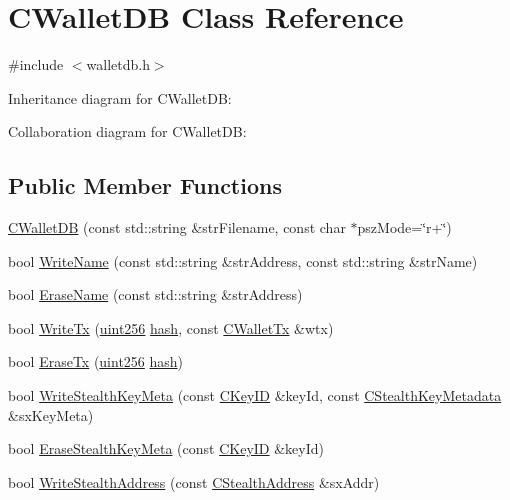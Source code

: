 \hypertarget{class_c_wallet_d_b}{}\section{C\+Wallet\+D\+B Class Reference}
\label{class_c_wallet_d_b}


{\ttfamily \#include $<$walletdb.\+h$>$}



Inheritance diagram for C\+Wallet\+D\+B\+:


Collaboration diagram for C\+Wallet\+D\+B\+:
\subsection*{Public Member Functions}
\begin{DoxyCompactItemize}
\item 
\hyperlink{class_c_wallet_d_b_abb8766ee5b03e8115438726c625f88a7}{C\+Wallet\+D\+B} (const std\+::string \&str\+Filename, const char $\ast$psz\+Mode=\char`\"{}r+\char`\"{})
\item 
bool \hyperlink{class_c_wallet_d_b_ad1b3bce77e9dd6ddd8c668a469c38f0a}{Write\+Name} (const std\+::string \&str\+Address, const std\+::string \&str\+Name)
\item 
bool \hyperlink{class_c_wallet_d_b_a319209fcf90ea860b668b92c44a3fa7a}{Erase\+Name} (const std\+::string \&str\+Address)
\item 
bool \hyperlink{class_c_wallet_d_b_a76d2ca02898221ab66df5d5f7491164e}{Write\+Tx} (\hyperlink{classuint256}{uint256} \hyperlink{cache_8cc_a11ecb029164e055f28f4123ce3748862}{hash}, const \hyperlink{class_c_wallet_tx}{C\+Wallet\+Tx} \&wtx)
\item 
bool \hyperlink{class_c_wallet_d_b_a498e00c693cacc4b558e6f5295ea32f2}{Erase\+Tx} (\hyperlink{classuint256}{uint256} \hyperlink{cache_8cc_a11ecb029164e055f28f4123ce3748862}{hash})
\item 
bool \hyperlink{class_c_wallet_d_b_a68428260802d8acd1a6f87f92b991841}{Write\+Stealth\+Key\+Meta} (const \hyperlink{class_c_key_i_d}{C\+Key\+I\+D} \&key\+Id, const \hyperlink{class_c_stealth_key_metadata}{C\+Stealth\+Key\+Metadata} \&sx\+Key\+Meta)
\item 
bool \hyperlink{class_c_wallet_d_b_a401ec8ec6c7e38cf87be9b92f95052a4}{Erase\+Stealth\+Key\+Meta} (const \hyperlink{class_c_key_i_d}{C\+Key\+I\+D} \&key\+Id)
\item 
bool \hyperlink{class_c_wallet_d_b_a2bce6f7f050d6d14e2c025a7beba2cfc}{Write\+Stealth\+Address} (const \hyperlink{class_c_stealth_address}{C\+Stealth\+Address} \&sx\+Addr)

\end{DoxyCompactItemize}
